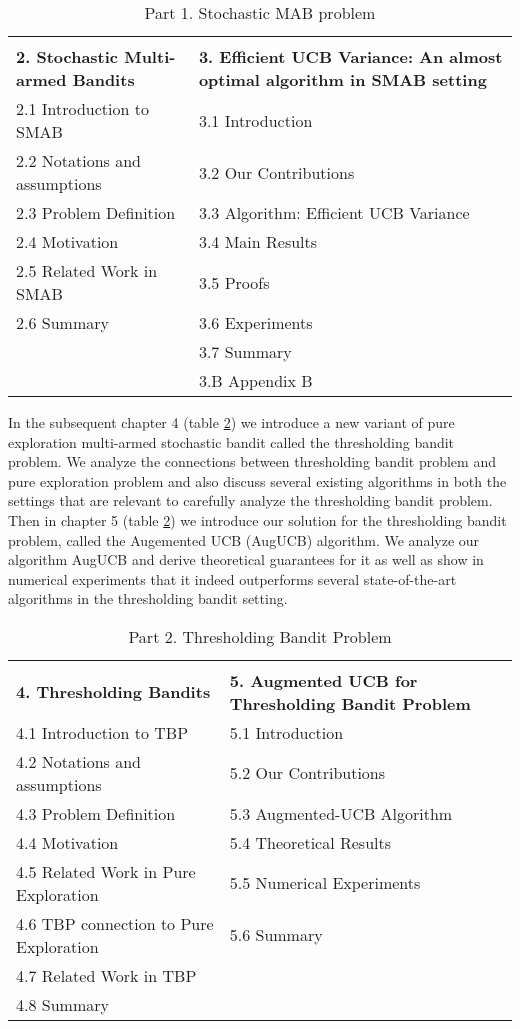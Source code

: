 \documentclass[MS,synopsis]{iitmdiss}
\begin{document}
\begin{table}[!th]
\begin{tabular}{p{16em}|p{16em}}
\hline\\
\textbf{2. Stochastic Multi-armed Bandits} & \textbf{3. Efficient UCB Variance: An almost optimal algorithm in SMAB setting}\\\hline
2.1 Introduction to SMAB & 3.1 Introduction\\
2.2 Notations and assumptions & 3.2 Our Contributions\\
2.3 Problem Definition & 3.3 Algorithm: Efficient UCB Variance\\
2.4 Motivation & 3.4 Main Results\\
2.5 Related Work in SMAB & 3.5 Proofs\\
2.6 Summary & 3.6 Experiments\\
& 3.7 Summary\\
& 3.B Appendix B\\
\hline
\end{tabular}
\caption{Part 1. Stochastic MAB problem}
\label{tab:chap2-3}
\end{table}


In the subsequent chapter 4 (table \ref{tab:chap4-5})  we introduce a new variant of pure exploration multi-armed stochastic bandit called the thresholding bandit problem. We analyze the connections between thresholding bandit problem and pure exploration problem and also discuss several existing algorithms in both the settings that are relevant to carefully analyze the thresholding bandit problem. Then in chapter 5 (table \ref{tab:chap4-5}) we introduce our solution for the thresholding bandit problem, called the Augemented UCB (AugUCB) algorithm. We analyze our algorithm AugUCB and derive theoretical guarantees for it as well as show in numerical experiments that it indeed outperforms several state-of-the-art algorithms in the thresholding bandit setting. 


\begin{table}[!th]
\begin{tabular}{p{16em}|p{16em}}
\hline\\
\textbf{4. Thresholding Bandits} & \textbf{5. Augmented UCB for Thresholding Bandit Problem}\\\hline
4.1 Introduction to TBP & 5.1 Introduction\\
4.2 Notations and assumptions & 5.2 Our Contributions\\
4.3 Problem Definition & 5.3 Augmented-UCB Algorithm\\
4.4 Motivation & 5.4 Theoretical Results\\
4.5 Related Work in Pure Exploration & 5.5 Numerical Experiments\\
4.6 TBP connection to Pure Exploration & 5.6 Summary\\
4.7 Related Work in TBP &\\
4.8 Summary & \\
\hline
\end{tabular}
\caption{Part 2. Thresholding Bandit Problem}
\label{tab:chap4-5}
\end{table}
\end{document}
